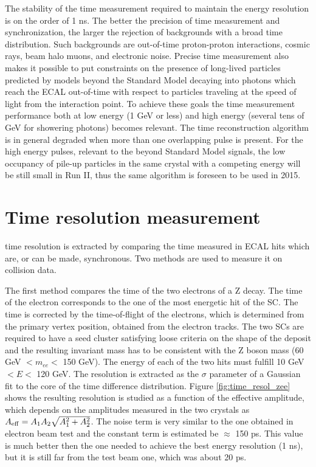 \documentclass[journal]{IEEEtran}
\begin{document}
The stability of the time measurement required to maintain the energy resolution is on the order of 1 ns. The better the precision of time measurement and synchronization, the larger the rejection of backgrounds with a broad time distribution. Such backgrounds are out-of-time proton-proton interactions, cosmic rays, beam halo muons, and electronic noise. Precise time measurement also makes it possible to put constraints on the presence of long-lived particles predicted by models beyond the Standard Model decaying into photons which reach the ECAL  out-of-time with respect to particles traveling at the speed of light from the interaction point. To achieve these goals the time measurement performance both at low energy (1 GeV or less) and high energy (several tens of GeV for showering photons) becomes relevant.
The time reconstruction algorithm is in general degraded when more than one overlapping pulse is present.  For the high energy pulses, relevant to the beyond Standard Model signals, the low occupancy of pile-up particles in the same crystal with a competing energy will be still small in Run II, thus the same algorithm is foreseen to be used in 2015.


\section{Time resolution measurement}
\label{sec:timeresolution}
 time resolution is extracted by comparing the time measured in ECAL hits which are, or can be made, synchronous. Two methods are used to measure it on collision data.

The first method compares the time of the two electrons of a Z decay. The time of the electron corresponds to the one of the most energetic hit of the SC. The time is corrected by the time-of-flight of the electrons, which is determined from the primary vertex position, obtained from the electron tracks. The two SCs are required to have a seed cluster satisfying loose criteria on the shape of the deposit and the resulting invariant mass has to be consistent with the Z boson mass (60 GeV $<m_{ee}<$ 150 GeV). The energy of each of the two hits must fulfill 10 GeV $<E<$ 120 GeV. The resolution is extracted as the $\sigma$ parameter of a Gaussian fit to the core of the time difference distribution. Figure \ref{fig:time_resol_zee} shows the resulting resolution is studied as a function of the effective amplitude, which depends on the amplitudes measured in the two crystals as $A_{\rm eff} = A_1 A_2 \sqrt{A_1^2 + A_2^2}$. The noise term is very similar to the one obtained in electron beam test and the constant term is estimated be $\approx$ 150 ps. This value is much better then the one needed to achieve the best energy resolution (1 ns), but it is still far from the test beam one, which was about 20 ps.
\end{document}

